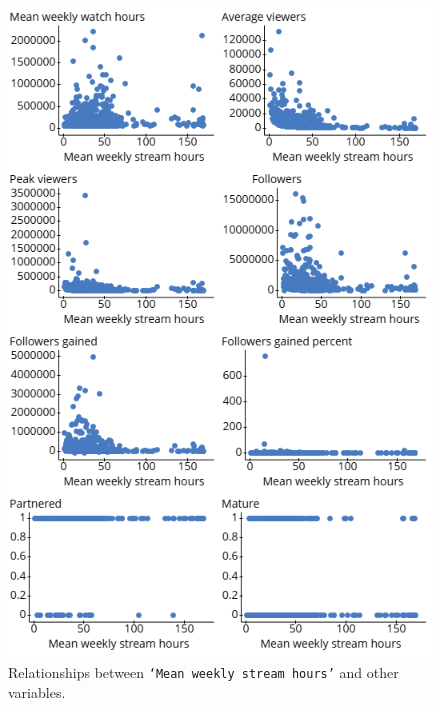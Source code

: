 \documentclass[12pt]{article}
\begin{document}
\begin{figure}
  \centering
  \includegraphics[width=0.8\linewidth]{../StatCrunch_Results/stream_scatter_plot_matrix.png}
  \captionsetup{justification=centering, singlelinecheck=false, margin=2cm}
  \caption[Stream Hours Scatter Plot Matrix]{Relationships between \texttt{`Mean weekly stream hours'} and other variables.}
  \label{fig:stream_scatter_matrix}
\end{figure}
\end{document}
